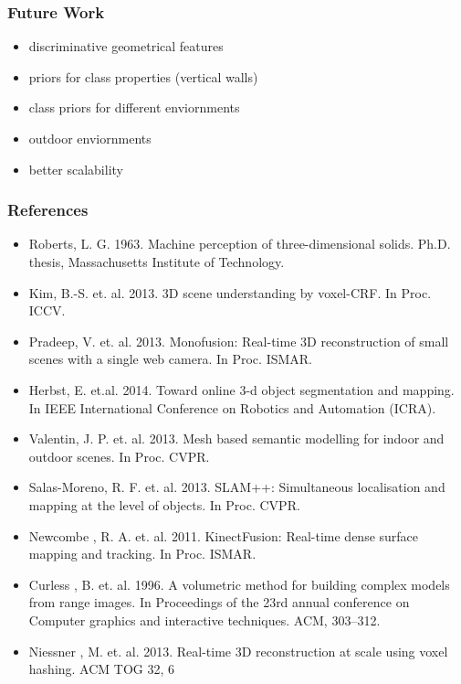\documentclass[mathserif, 10pt]{beamer}
\begin{document}
\begin{frame}
\frametitle{Future Work}
\begin{itemize}
  \item discriminative geometrical features
  \item priors for class properties (vertical walls)
 \item class priors for different enviornments
 \item outdoor enviornments
 \item better scalability
\end{itemize}

\end{frame}


\begin{frame}
\frametitle{References}
\fontsize{6pt}{7.2}\selectfont
\begin{itemize}
  \item Roberts, L. G. 1963. Machine perception of three-dimensional solids. Ph.D. thesis, Massachusetts Institute of Technology.

  \item Kim, B.-S. et. al. 2013. 3D scene understanding by voxel-CRF. In Proc. ICCV.

  \item Pradeep, V. et. al. 2013. Monofusion: Real-time 3D reconstruction of small scenes with a single web camera. In Proc. ISMAR.

  \item Herbst, E. et.al. 2014. Toward online 3-d object segmentation and mapping. In IEEE International Conference on Robotics and Automation (ICRA).

  \item Valentin, J. P. et. al. 2013. Mesh based semantic modelling for indoor and outdoor scenes. In Proc. CVPR.

  \item Salas-Moreno, R. F. et. al. 2013. SLAM++: Simultaneous localisation and mapping at the level of objects. In Proc. CVPR.

  \item Newcombe , R. A. et. al. 2011. KinectFusion: Real-time dense surface mapping and tracking. In Proc. ISMAR.  
  
  \item Curless , B. et. al. 1996. A volumetric method for building complex models from range images. In Proceedings of the 23rd annual conference on Computer graphics and interactive techniques. ACM, 303–312.
  
  \item Niessner , M. et. al. 2013. Real-time 3D reconstruction at scale using voxel hashing. ACM TOG 32, 6
\end{itemize}
\end{frame}
\end{document}
